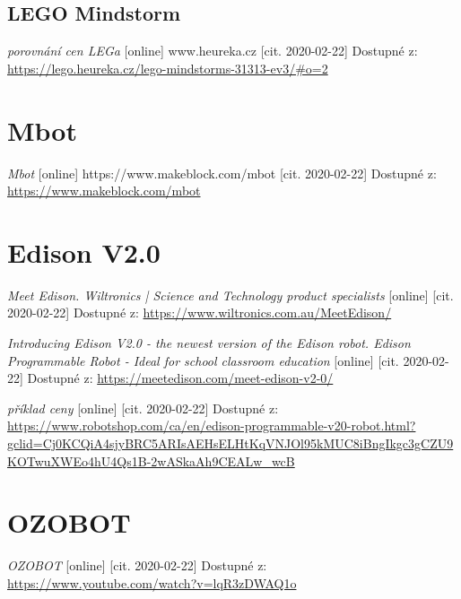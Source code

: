 \documentclass{template/socthesis}
\begin{document}
\listoffigures
{}

\listoftables
{}
\renewcommand{\refname}{Další zdroje}
\begin{thebibliography}{1}
	
	\subsection*{LEGO Mindstorm}
	
	\textit{porovnání cen LEGa} [online] www.heureka.cz [cit. 2020-02-22] Dostupné z: \\ 
	\url{https://lego.heureka.cz/lego-mindstorms-31313-ev3/#o=2}
	
	
	\section{Mbot}
	\textit{Mbot} [online] https://www.makeblock.com/mbot [cit. 2020-02-22] Dostupné z: \url{https://www.makeblock.com/mbot}
	
	
	\section{Edison V2.0}
	\textit{Meet Edison. Wiltronics | Science and Technology product specialists} [online] [cit. 2020-02-22] Dostupné z: \url{https://www.wiltronics.com.au/MeetEdison/}
	
	\textit{Introducing Edison V2.0 - the newest version of the Edison robot. Edison Programmable Robot - Ideal for school classroom education} [online] [cit. 2020-02-22] Dostupné z:
	\url{https://meetedison.com/meet-edison-v2-0/}
	 
	\textit{příklad ceny} [online] [cit. 2020-02-22] Dostupné z: \\ 
	\url{https://www.robotshop.com/ca/en/edison-programmable-v20-robot.html?gclid=Cj0KCQiA4sjyBRC5ARIsAEHsELHtKqVNJOl95kMUC8iBngIkgc3gCZU9KOTwuXWEo4hU4Qs1B-2wASkaAh9CEALw_wcB}
	
	\section{OZOBOT}
	
	\textit{OZOBOT} [online] [cit. 2020-02-22] Dostupné z:
	\url{https://www.youtube.com/watch?v=lqR3zDWAQ1o}
	

\end{thebibliography}
\end{document}
